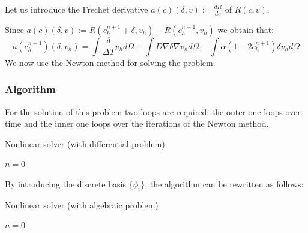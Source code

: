 \documentclass[12pt, letterpaper]{article}
\begin{document}
\noindent Let us introduce the Frechet derivative $a(c)(\delta,v):=\frac{dR}{dc}$ of $R(c,v)$.

\noindent Since $a(c)(\delta,v):=R(c_h^{n+1}+\delta,v_h)-R(c_h^{n+1},v_h)$ we obtain that:
$$
a(c_h^{n+1})(\delta, v_h)=\int\frac{\delta}{\Delta T}v_hd\Omega+\int D\nabla\delta\nabla v_h d\Omega-\int\alpha(1-2c_h^{n+1})\delta v_h d\Omega
$$
We now use the Newton method for solving the problem.

\subsubsection{Algorithm}
For the solution of this problem two loops are required: the outer one loops over time and the inner one loops over the iterations of the Newton method.

\vspace{0.5em}
\begin{algorithm}[H]
    \caption{Nonlinear solver (with differential problem)}
    \label{nonlinear-solver}

    $n = 0$\;
\end{algorithm}
\vspace{0.5em}
\noindent By introducing the discrete basis $\{\phi_i\}$, the algorithm can be rewritten as follows:

\vspace{0.5em}
\begin{algorithm}[H]
    \caption{Nonlinear solver (with algebraic problem)}
    \label{nonlinear-solver}

    $n = 0$\;
\end{algorithm}
\end{document}
